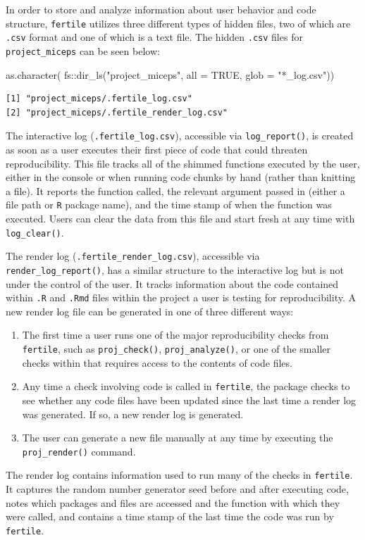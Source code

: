 \documentclass[12pt,twoside]{reedthesis}
\newenvironment{Shaded}{\begin{snugshade}}{\end{snugshade}}
\newcommand{\AttributeTok}[1]{\textcolor[rgb]{0.77,0.63,0.00}{#1}}
\newcommand{\ConstantTok}[1]{\textcolor[rgb]{0.00,0.00,0.00}{#1}}
\newcommand{\FunctionTok}[1]{\textcolor[rgb]{0.00,0.00,0.00}{#1}}
\newcommand{\NormalTok}[1]{#1}
\newcommand{\SpecialCharTok}[1]{\textcolor[rgb]{0.00,0.00,0.00}{#1}}
\newcommand{\StringTok}[1]{\textcolor[rgb]{0.31,0.60,0.02}{#1}}
\begin{document}
In order to store and analyze information about user behavior and code structure, \texttt{fertile} utilizes three different types of hidden files, two of which are \texttt{.csv} format and one of which is a text file. The hidden \texttt{.csv} files for \texttt{project\_miceps} can be seen below:
\begin{Shaded}
\begin{Highlighting}[]
\FunctionTok{as.character}\NormalTok{(}
\NormalTok{  fs}\SpecialCharTok{::}\FunctionTok{dir\_ls}\NormalTok{(}\StringTok{"project\_miceps"}\NormalTok{, }\AttributeTok{all =} \ConstantTok{TRUE}\NormalTok{, }\AttributeTok{glob =} \StringTok{"*\_log.csv"}\NormalTok{))}
\end{Highlighting}
\end{Shaded}
\begin{verbatim}
[1] "project_miceps/.fertile_log.csv"       
[2] "project_miceps/.fertile_render_log.csv"
\end{verbatim}
The interactive log (\texttt{.fertile\_log.csv}), accessible via \texttt{log\_report()}, is created as soon as a user executes their first piece of code that could threaten reproducibility. This file tracks all of the shimmed functions executed by the user, either in the console or when running code chunks by hand (rather than knitting a file). It reports the function called, the relevant argument passed in (either a file path or \texttt{R} package name), and the time stamp of when the function was executed. Users can clear the data from this file and start fresh at any time with \texttt{log\_clear()}.

The render log (\texttt{.fertile\_render\_log.csv}), accessible via \texttt{render\_log\_report()}, has a similar structure to the interactive log but is not under the control of the user. It tracks information about the code contained within \texttt{.R} and \texttt{.Rmd} files within the project a user is testing for reproducibility. A new render log file can be generated in one of three different ways:
\begin{enumerate}
\def\labelenumi{\arabic{enumi}.}
\item
  The first time a user runs one of the major reproducibility checks from \texttt{fertile}, such as \texttt{proj\_check()}, \texttt{proj\_analyze()}, or one of the smaller checks within that requires access to the contents of code files.
\item
  Any time a check involving code is called in \texttt{fertile}, the package checks to see whether any code files have been updated since the last time a render log was generated. If so, a new render log is generated.
\item
  The user can generate a new file manually at any time by executing the \texttt{proj\_render()} command.
\end{enumerate}
The render log contains information used to run many of the checks in \texttt{fertile}. It captures the random number generator seed before and after executing code, notes which packages and files are accessed and the function with which they were called, and contains a time stamp of the last time the code was run by \texttt{fertile}.
\end{document}
